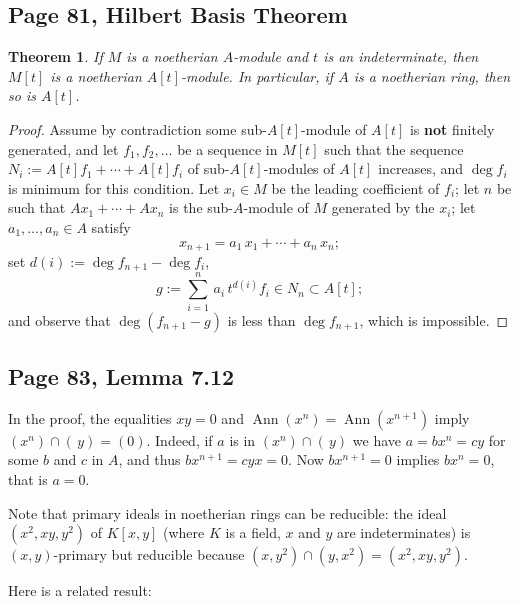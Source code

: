 \documentclass[parskip=half,fontsize=12pt]{scrartcl}%
\newcommand{\oo}{\operatorname}\newcommand{\ooo}{\operatorname*}
\newtheorem{thm}{Theorem}%
\begin{document}
\subsection{Page 81, Hilbert Basis Theorem}%

\begin{thm}\label{hbt}
If $M$ is a noetherian $A$-module and $t$ is an indeterminate, then $M[t]$ is a noetherian $A[t]$-module. In particular, if $A$ is a noetherian ring, then so is $A[t]$.
\end{thm}

\begin{proof}
Assume by contradiction some sub-$A[t]$-module of $A[t]$ is \textbf{not} finite\-ly generated, and let $f_1,f_2,\dots$ be a sequence in $M[t]$ such that the sequence $N_i:=A[t]f_1+\cdots+A[t]f_i$ of sub-$A[t]$-modules of $A[t]$ increases, and $\deg f_i$ is minimum for this condition. Let $x_i\in M$ be the leading coefficient of $f_i$; let $n$ be such that $Ax_1+\cdots+Ax_n$ is the sub-$A$-module of $M$ generated by the $x_i$; let $a_1,\dots,a_n\in A$ satisfy 
$$
x_{n+1}=a_1\,x_1+\cdots+a_n\,x_n;
$$ 
set $d(i):=\deg f_{n+1}-\deg f_i$, 
$$
g:=\sum_{i=1}^n\,a_i\,t^{d(i)}f_i\in N_n\subset A[t];
$$ 
and observe that $\deg(f_{n+1}-g)$ is less than $\deg f_{n+1}$, which is impossible.
\end{proof}

\subsection{Page 83, Lemma 7.12}%

In the proof, the equalities $xy=0$ and $\oo{Ann}(x^n)=\oo{Ann}(x^{n+1})$ imply $(x^n)\cap(\,y)=(0)$. Indeed, if $a$ is in $(x^n)\cap(\,y)$ we have $a=bx^n=cy$ for some $b$ and $c$ in $A$, and thus $bx^{n+1}=cyx=0$. Now $bx^{n+1}=0$ implies $bx^n=0$, that is $a=0$. 

Note that primary ideals in noetherian rings can be reducible: the ideal $(x^2,xy,y^2)$ of $K[x,y]$ (where $K$ is a field, $x$ and $y$ are indeterminates) is $(x,y)$-primary but reducible because $(x,y^2)\cap(y,x^2)=(x^2,xy,y^2)$. 


Here is a related result:
\end{document}
